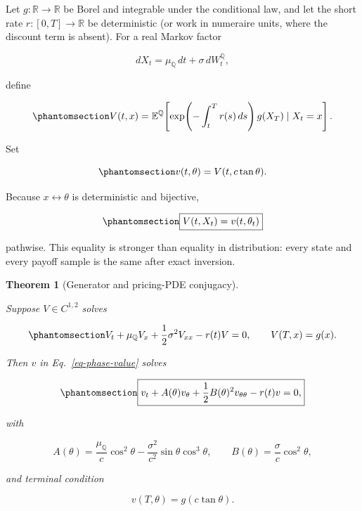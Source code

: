 \documentclass[
  english,
  10pt,
  letterpaper,
  DIV=11,
  numbers=noendperiod]{scrartcl}
\theoremstyle{definition}
\theoremstyle{plain}
\newtheorem{theorem}{Theorem}[section]
\theoremstyle{plain}
\theoremstyle{remark}
\begin{document}
Let \(g:\mathbb R\to\mathbb R\) be Borel and integrable under the
conditional law, and let the short rate \(r:[0,T]\to\mathbb R\) be
deterministic (or work in numeraire units, where the discount term is
absent). For a real Markov factor

\[
dX_t=\mu_{\mathbb Q}\,dt+\sigma\,dW_t^{\mathbb Q},
\]

define

\begin{equation}\protect\phantomsection\label{eq-scalar-value}{
V(t,x)
=
\mathbb E^{\mathbb Q}\!\left[
\exp\!\left(-\int_t^T r(s)\,ds\right)
g(X_T)
\mid X_t=x
\right].
}\end{equation}

Set

\begin{equation}\protect\phantomsection\label{eq-phase-value}{
v(t,\theta)=V(t,c\tan\theta).
}\end{equation}

Because \(x\leftrightarrow\theta\) is deterministic and bijective,

\begin{equation}\protect\phantomsection\label{eq-value-invariance}{
\boxed{
V(t,X_t)=v(t,\theta_t)
}
}\end{equation}

pathwise. This equality is stronger than equality in distribution: every
state and every payoff sample is the same after exact inversion.

\begin{theorem}[Generator and pricing-PDE
conjugacy]\protect\hypertarget{thm-pricing-conjugacy}{}\label{thm-pricing-conjugacy}

Suppose \(V\in C^{1,2}\) solves

\begin{equation}\protect\phantomsection\label{eq-scalar-pricing-pde}{
V_t+\mu_{\mathbb Q}V_x+\frac12\sigma^2V_{xx}-r(t)V=0,
\qquad
V(T,x)=g(x).
}\end{equation}

Then \(v\) in Eq.~\ref{eq-phase-value} solves

\begin{equation}\protect\phantomsection\label{eq-phase-pricing-pde}{
\boxed{
v_t+A(\theta)v_\theta
+\frac12B(\theta)^2v_{\theta\theta}
-r(t)v=0,
}
}\end{equation}

with

\[
A(\theta)
=\frac{\mu_{\mathbb Q}}{c}\cos^2\theta
-\frac{\sigma^2}{c^2}\sin\theta\cos^3\theta,
\qquad
B(\theta)=\frac{\sigma}{c}\cos^2\theta,
\]

and terminal condition

\[
v(T,\theta)=g(c\tan\theta).
\]

\end{theorem}
\end{document}
